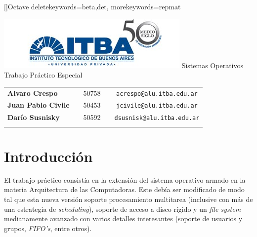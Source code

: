 \documentclass[a4paper,10pt]{article}
\begin{document}
\renewcommand{\lstlistingname}{C\'odigo Fuente}
[]{Octave}{
	deletekeywords={beta,det},
	morekeywords={repmat}
} 
\begin{titlepage}
        \thispagestyle{empty}
        \begin{center}
                \includegraphics{./images/itba.jpg}
                \vfill
                \Huge{Sistemas Operativos}\\
                \vspace{1cm}
                \huge{Trabajo Práctico Especial}\\
        \end{center}
        \vspace{2cm}
        \large{
                \begin{tabular}{lcrc}
                        \textbf{Alvaro Crespo} & & 50758 & \ \ \texttt{acrespo@alu.itba.edu.ar}\\
                        \textbf{Juan Pablo Civile} & & 50453 & \ \ \texttt{jcivile@alu.itba.edu.ar}\\
                        \textbf{Darío Susnisky} & & 50592 & \ \ \texttt{dsusnisk@alu.itba.edu.ar}\\
                        \\ 
                \end{tabular}
        }
        \vfill
\end{titlepage}

\setcounter{page}{1}

\tableofcontents
\newpage
\section{Introducción}
El trabajo práctico consistía en la extensión del sistema operativo armado en la materia Arquitectura de las 
Computadoras. Este debía ser modificado de modo tal que esta nueva versión soporte procesamiento multitarea
 (inclusive con más de una estrategia de \textit{scheduling}), soporte de acceso a disco rígido y un \textit{file system}
 medianamente avanzado con varios detalles interesantes (soporte de usuarios y grupos, \textit{FIFO's}, entre otros).
\end{document}
